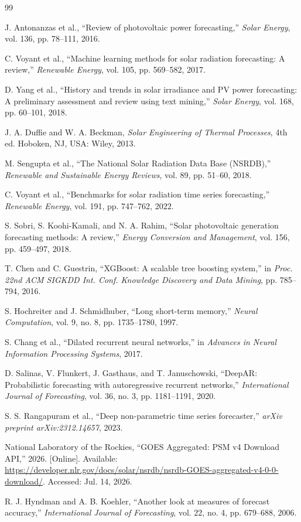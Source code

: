 \documentclass[11pt,a4paper]{article}
\begin{document}
\begin{thebibliography}{99}

J. Antonanzas et al., ``Review of photovoltaic power forecasting,'' \textit{Solar Energy}, vol. 136, pp. 78--111, 2016.

C. Voyant et al., ``Machine learning methods for solar radiation forecasting: A review,'' \textit{Renewable Energy}, vol. 105, pp. 569--582, 2017.

D. Yang et al., ``History and trends in solar irradiance and PV power forecasting: A preliminary assessment and review using text mining,'' \textit{Solar Energy}, vol. 168, pp. 60--101, 2018.

J. A. Duffie and W. A. Beckman, \textit{Solar Engineering of Thermal Processes}, 4th ed. Hoboken, NJ, USA: Wiley, 2013.

M. Sengupta et al., ``The National Solar Radiation Data Base (NSRDB),'' \textit{Renewable and Sustainable Energy Reviews}, vol. 89, pp. 51--60, 2018.

C. Voyant et al., ``Benchmarks for solar radiation time series forecasting,'' \textit{Renewable Energy}, vol. 191, pp. 747--762, 2022.

S. Sobri, S. Koohi-Kamali, and N. A. Rahim, ``Solar photovoltaic generation forecasting methods: A review,'' \textit{Energy Conversion and Management}, vol. 156, pp. 459--497, 2018.

T. Chen and C. Guestrin, ``XGBoost: A scalable tree boosting system,'' in \textit{Proc. 22nd ACM SIGKDD Int. Conf. Knowledge Discovery and Data Mining}, pp. 785--794, 2016.

S. Hochreiter and J. Schmidhuber, ``Long short-term memory,'' \textit{Neural Computation}, vol. 9, no. 8, pp. 1735--1780, 1997.

S. Chang et al., ``Dilated recurrent neural networks,'' in \textit{Advances in Neural Information Processing Systems}, 2017.

D. Salinas, V. Flunkert, J. Gasthaus, and T. Januschowski, ``DeepAR: Probabilistic forecasting with autoregressive recurrent networks,'' \textit{International Journal of Forecasting}, vol. 36, no. 3, pp. 1181--1191, 2020.

S. S. Rangapuram et al., ``Deep non-parametric time series forecaster,'' \textit{arXiv preprint arXiv:2312.14657}, 2023.

National Laboratory of the Rockies, ``GOES Aggregated: PSM v4 Download API,'' 2026. [Online]. Available: \url{https://developer.nlr.gov/docs/solar/nsrdb/nsrdb-GOES-aggregated-v4-0-0-download/}. Accessed: Jul. 14, 2026.

R. J. Hyndman and A. B. Koehler, ``Another look at measures of forecast accuracy,'' \textit{International Journal of Forecasting}, vol. 22, no. 4, pp. 679--688, 2006.

\end{thebibliography}
\end{document}
